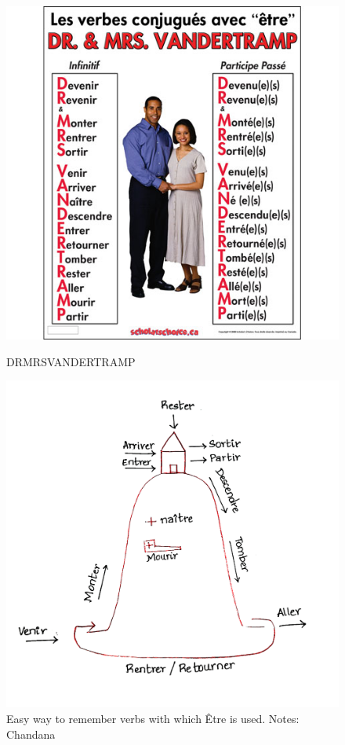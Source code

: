 \begin{figure}[!h]
\centering
\includegraphics[height=0.4\textheight]{images/DrMrsVandertramp.jpg}
\caption{DRMRSVANDERTRAMP}
\label{fig:DRMRSVANDERTRAMP}

\includegraphics[width=0.4\textheight]{images/PastTense.png}
\caption{Easy way to remember verbs with which \^Etre is used. Notes: Chandana}
\label{fig:pastTenseEtreVerbs}
\end{figure}


